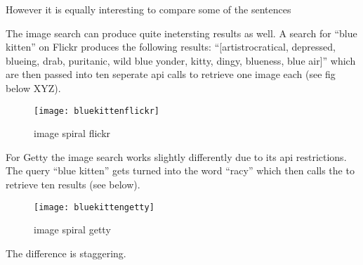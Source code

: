 \spirals

However it is equally interesting to compare some of the sentences



\spirals

The image search can produce quite inetersting results as well. A search for ``blue kitten'' on Flickr produces the following results: ``[artistrocratical, depressed, blueing, drab, puritanic, wild blue yonder, kitty, dingy, blueness, blue air]'' which are then passed into ten seperate \gls{api} calls to retrieve one image each (see fig below XYZ).


\begin{figure}[h!]
\centering
  \texttt{[image: bluekittenflickr]}
\caption[image spiral flickr]{image spiral flickr}
\label{fig:imgspiralflickr}
\end{figure}

For Getty the image search works slightly differently due to its \gls{api} restrictions. The query ``blue kitten'' gets turned into the word ``racy'' which then calls the  to retrieve ten results (see below).

\begin{figure}[h!]
\centering
  \texttt{[image: bluekittengetty]}
\caption[image spiral getty]{image spiral getty}
\label{fig:imgspiralgetty}
\end{figure}

The difference is staggering.










